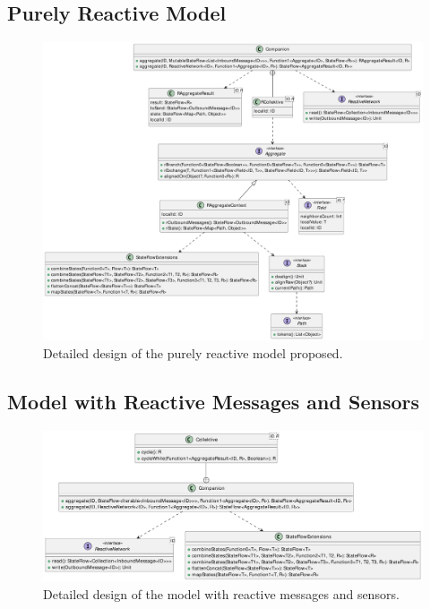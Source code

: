 \subsection{Purely Reactive Model}

\begin{figure}
    \centering
    \includegraphics[width=\linewidth]{figures/collektive-prm-design.pdf}
    \caption{Detailed design of the purely reactive model proposed.}
    \label{fig:collektive-prm-design}
\end{figure}

\subsection{Model with Reactive Messages and Sensors}

\begin{figure}
    \centering
    \includegraphics[width=\linewidth]{figures/collektive-rmsm-design.pdf}
    \caption{Detailed design of the model with reactive messages and sensors.}
    \label{fig:collektive-rmsm-design}
\end{figure}
